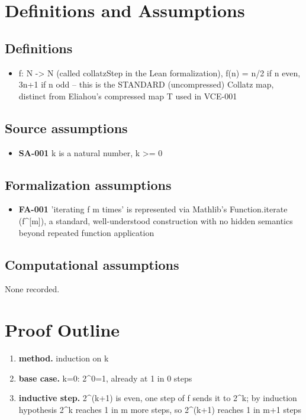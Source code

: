 \documentclass[11pt]{article}
\begin{document}
\section{Definitions and Assumptions}
\subsection*{Definitions}
\begin{itemize}
\item f: N -> N (called collatzStep in the Lean formalization), f(n) = n/2 if n even, 3n+1 if n odd -- this is the STANDARD (uncompressed) Collatz map, distinct from Eliahou's compressed map T used in VCE-001
\end{itemize}
\subsection*{Source assumptions}
\begin{itemize}
\item \textbf{SA-001} k is a natural number, k >= 0
\end{itemize}
\subsection*{Formalization assumptions}
\begin{itemize}
\item \textbf{FA-001} 'iterating f m times' is represented via Mathlib's Function.iterate (f\textasciicircum{}[m]), a standard, well-understood construction with no hidden semantics beyond repeated function application
\end{itemize}
\subsection*{Computational assumptions}
None recorded.
\section{Proof Outline}
\begin{enumerate}
\item \textbf{method.} induction on k
\item \textbf{base case.} k=0: 2\textasciicircum{}0=1, already at 1 in 0 steps
\item \textbf{inductive step.} 2\textasciicircum{}(k+1) is even, one step of f sends it to 2\textasciicircum{}k; by induction hypothesis 2\textasciicircum{}k reaches 1 in m more steps, so 2\textasciicircum{}(k+1) reaches 1 in m+1 steps
\end{enumerate}
\end{document}
